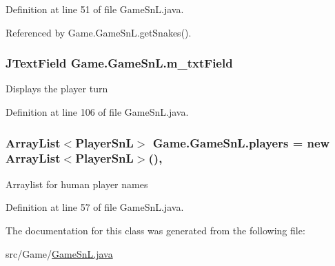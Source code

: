 Definition at line 51 of file Game\+Sn\+L.\+java.



Referenced by Game.\+Game\+Sn\+L.\+get\+Snakes().

\hypertarget{class_game_1_1_game_sn_l_a0726c8332d62c46e936a13dc4d3abd1b}{}
\subsubsection[{m\+\_\+txt\+Field}]{\setlength{\rightskip}{0pt plus 5cm}J\+Text\+Field Game.\+Game\+Sn\+L.\+m\+\_\+txt\+Field\hspace{0.3cm}{\ttfamily [private]}}\label{class_game_1_1_game_sn_l_a0726c8332d62c46e936a13dc4d3abd1b}
Displays the player turn 

Definition at line 106 of file Game\+Sn\+L.\+java.

\hypertarget{class_game_1_1_game_sn_l_a942dda31e02524f87962efa42b2c2642}{}
\subsubsection[{players}]{\setlength{\rightskip}{0pt plus 5cm}Array\+List$<${\bf Player\+Sn\+L}$>$ Game.\+Game\+Sn\+L.\+players = new Array\+List$<${\bf Player\+Sn\+L}$>$()\hspace{0.3cm}{\ttfamily [static]}, {\ttfamily [private]}}\label{class_game_1_1_game_sn_l_a942dda31e02524f87962efa42b2c2642}
Arraylist for human player names 

Definition at line 57 of file Game\+Sn\+L.\+java.



The documentation for this class was generated from the following file\+:\begin{DoxyCompactItemize}
\item 
src/\+Game/\hyperlink{_game_sn_l_8java}{Game\+Sn\+L.\+java}\end{DoxyCompactItemize}
